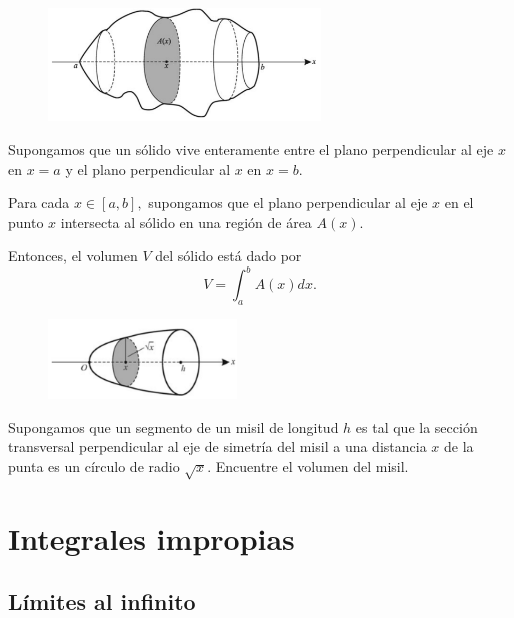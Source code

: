\begin{figure}
 \centering
 \includegraphics[height=3cm,keepaspectratio=true]{./calculo/fig3008.png}
 \label{fig:3008}
\end{figure}


Supongamos que un s\'olido vive enteramente entre el plano perpendicular al eje $x$ en $x=a$ y el plano perpendicular al  $x$ en $x=b.$ 

Para cada $x\in [a,b],$ supongamos que el plano perpendicular al eje $x$ en el punto $x$ intersecta al s\'olido en una regi\'on de área $A(x).$



Entonces, el volumen $V$ del s\'olido está dado por 
\[
 \label{fst}
 \tag{FST}
 V=\int_{a}^{b}A(x)dx.
\]


\begin{problema}
\begin{figure}
 \centering
 \includegraphics[width=5cm,keepaspectratio=true]{./calculo/fig3009.png}
 \label{fig:3009}
\end{figure}

 Supongamos que un segmento de un misil de longitud $h$ es tal que la secci\'on transversal perpendicular al eje de simetr\'ia del misil a una distancia $x$ de la punta  es un c\'irculo de radio $\sqrt{x}.$ Encuentre el volumen del misil.
\end{problema}



\section{Integrales impropias}

\subsection{L\'imites al infinito}


